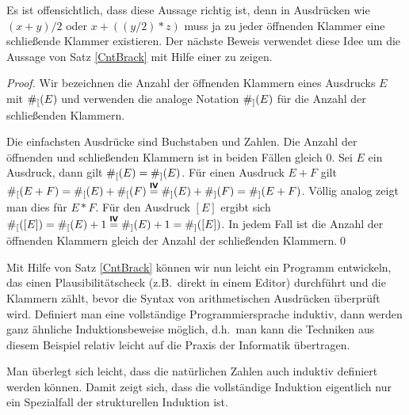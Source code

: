 Es ist offensichtlich, dass diese Aussage richtig ist, denn in
Ausdrücken wie $(x + y) / 2$ oder $x + ((y/2) * z)$ muss ja zu jeder
öffnenden Klammer eine schließende Klammer existieren. Der nächste
Beweis verwendet diese Idee um die Aussage von Satz \ref{CntBrack}
mit Hilfe einer 
zu zeigen.

\begin{proof}
Wir bezeichnen die Anzahl der öffnenden Klammern eines Ausdrucks $E$
mit $\#_[(E)$ und verwenden die analoge Notation $\#_](E)$ für die
Anzahl der schließenden Klammern.

\induproof%
{
Die einfachsten Ausdrücke sind Buchstaben und Zahlen. Die Anzahl der
öffnenden und schließenden Klammern ist in beiden Fällen gleich $0$.
}
{
Sei $E$ ein Ausdruck, dann gilt $\#_[(E) = \#_](E)$.
}
{
 Für einen Ausdruck $E + F$ gilt $\#_[(E + F) = \#_[(E
) +
 \#_[(F) \stackrel{\text{\textbf{\textsf{IV}}}}{=} \#_](E) +
 \#_](F) = \#_](E + F)$. Völlig analog zeigt man dies für $E *
 F$. Für den Ausdruck $[E]$ ergibt sich $\#_[([E]) = \#_[(E) + 1
 \stackrel{\text{\textbf{\textsf{IV}}}}{=} \#_](E) + 1 = \#_]([E])$.
 In jedem Fall ist die Anzahl der öffnenden Klammern gleich der Anzahl
 der schließenden Klammern.\qed
}
\end{proof}

\bigskip

Mit Hilfe von Satz \ref{CntBrack} können wir nun leicht ein Programm
entwickeln, das einen Plausibilitätscheck (z.B.~direkt in einem Editor)
durchführt und die Klammern zählt, bevor die Syntax von arithmetischen
Ausdrücken überprüft wird. Definiert man eine vollständige
Programmiersprache induktiv, dann werden ganz ähnliche
Induktionsbeweise möglich, d.h.~man kann die Techniken aus diesem
Beispiel relativ leicht auf die Praxis der Informatik übertragen.

Man überlegt sich leicht, dass die natürlichen Zahlen auch induktiv
definiert werden können. Damit zeigt sich, dass die vollständige
Induktion eigentlich nur ein Spezialfall der strukturellen Induktion
ist.
